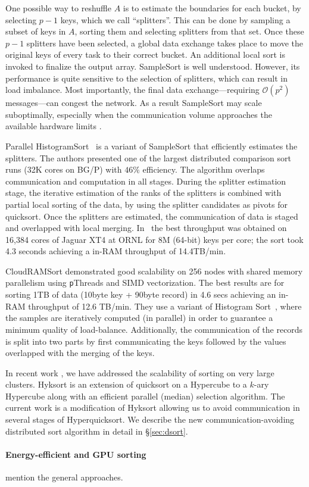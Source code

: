 One possible way to reshuffle $A$ is to estimate the boundaries for each bucket, by selecting $p-1$ keys, which we call
``splitters''. This can be done  by sampling a
subset of keys in $A$, sorting them and selecting splitters from that set. Once these $p-1$ splitters have been
selected, a global data exchange takes place to move the original keys of every task to their correct bucket.
An additional local sort is invoked to finalize the output array. SampleSort is well understood. However, its performance is quite sensitive to the selection of splitters, which can result in load imbalance. Most importantly, the final data exchange---requiring $\mathcal{O}(p^2)$ messages---can congest the network. As a result SampleSort may scale 
suboptimally, especially when the communication volume approaches the available hardware limits \cite{hyksort}.

Parallel HistogramSort~\cite{kale93,solomonik10} is
a variant of SampleSort that efficiently estimates the splitters. The authors presented
one of the largest distributed comparison sort runs (32K cores on
BG/P) with $46\%$ efficiency. The algorithm overlaps communication
and computation in all stages. During the splitter estimation
stage, the iterative estimation of the ranks of the splitters is
combined with partial local sorting of the data, by using the
splitter candidates as pivots for quicksort. Once the splitters
are estimated, the communication of data is staged and overlapped
with local merging. In~\cite{solomonik10} the best throughput was
obtained on 16,384 cores of Jaguar XT4 at ORNL for 8M (64-bit) keys
per core; the sort took 4.3 seconds achieving a in-RAM throughput of
14.4TB/min. 

CloudRAMSort \cite{kim12} demonstrated good scalability on 256 nodes with shared memory
parallelism using {\texttt pThreads} and SIMD vectorization. The
best results are for sorting 1TB of data (10byte key + 90byte
record) in 4.6 secs achieving an in-RAM throughput of 12.6 TB/min. They
use a variant of Histogram Sort~\cite{kale93}, where the
samples are iteratively computed (in parallel) in order to guarantee
a minimum quality of load-balance. Additionally, the communication of the records is split into two parts by first communicating the keys followed by the values overlapped with the merging of the keys. 

In recent work \cite{hyksort}, we have addressed the scalability of sorting on very large clusters. Hyksort\cite{hyksort} is an extension of quicksort on a Hypercube \cite{wagar87} to a $k$-ary Hypercube along with an efficient parallel (median) selection algorithm. The current work is a modification of Hyksort\cite{hyksort} allowing
us to avoid communication in several stages of Hyperquicksort. We describe the new communication-avoiding distributed sort algorithm in detail in \S\ref{sec:dsort}.

\paragraph{Energy-efficient and GPU sorting}
mention the general approaches. 
